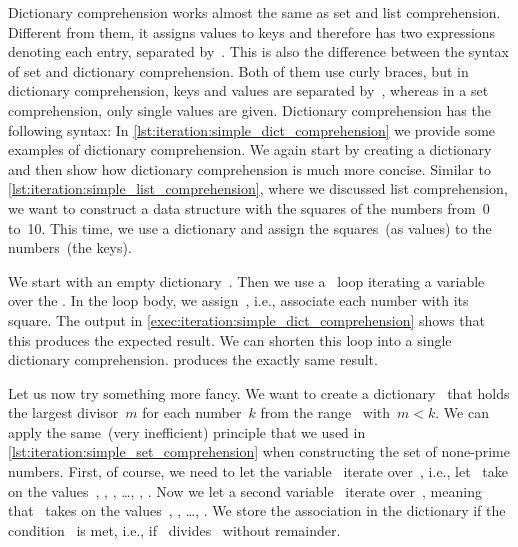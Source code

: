 %
\FloatBarrier%
\endhsection%
%
%
%
Dictionary comprehension works almost the same as set and list comprehension.
Different from them, it assigns values to keys and therefore has two expressions denoting each entry, separated by~\pythonilIdx{:}.
This is also the difference between the syntax of set and dictionary comprehension.
Both of them use curly braces, but in dictionary comprehension, keys and values are separated by~\pythonilIdx{:}, whereas in a set comprehension, only single values are given.
Dictionary comprehension has the following syntax:%
%
%
%
\FloatBarrier%
%
%
%
%
In \cref{lst:iteration:simple_dict_comprehension} we provide some examples of dictionary comprehension.
We again start by  creating a dictionary and then show how dictionary comprehension is much more concise.
Similar to \cref{lst:iteration:simple_list_comprehension}, where we discussed list comprehension, we want to construct a data structure with the squares of the numbers from~0 to~10.
This time, we use a dictionary and assign the squares~(as values) to the numbers~(the keys).

We start with an empty dictionary~.
Then we use a ~loop iterating a variable~ over the .
In the loop body, we assign~, i.e., associate each number with its square.
The output in \cref{exec:iteration:simple_dict_comprehension} shows that this produces the expected result.
We can shorten this loop into a single dictionary comprehension.
 produces the exactly same result.

Let us now try something more fancy.
We want to create a dictionary~ that holds the largest divisor~$m$ for each number~$k$ from the range~ with~$m<k$.
We can apply the same~(very inefficient) principle that we used in \cref{lst:iteration:simple_set_comprehension} when constructing the set of none-prime numbers.
First, of course, we need to let the variable~ iterate over~, i.e., let~ take on the values~, , , \dots, , .
Now we let a second variable~ iterate over~, meaning that~ takes on the values~, , \dots, .
We store the association  in the dictionary if the condition~ is met, i.e., if~ divides~ without remainder.

